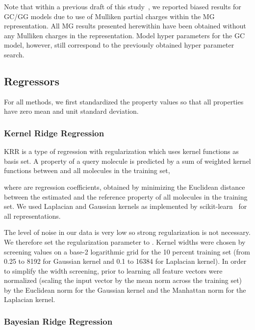 \documentclass[reprint, superscriptaddress,
amsmath,amssymb, aps, prb,
]{revtex4-1}
\begin{document}
{Note that within a previous draft of this study~\cite{faber2017fast}, we reported biased results for GC/GG models due to use of Mulliken partial charges within the MG representation.
All MG results presented herewithin have been obtained without any Mulliken charges in the representation. 
Model hyper parameters for the GC model, however, still correspond to the previously obtained hyper parameter search. 

\subsection{Regressors}

For all methods, we first standardized the property values so that all properties have zero mean and unit standard deviation.

\subsubsection{Kernel Ridge Regression}

KRR \cite{muller2001introduction,scholkopf2002learning,Vovk2013,kernel_ridge_regression2}  is a type of regression with regularization
\cite{Ridge_Regression} which uses kernel functions as basis set.
A property  of a query molecule  is predicted by a sum of weighted kernel functions  between  and all molecules  in the training set, 


where  are regression coefficients, obtained by minimizing the Euclidean distance between the estimated and the reference property of all molecules in the training set. 
We used Laplacian and Gaussian kernels as implemented by scikit-learn~\cite{scikit-learn} for all representations.

The level of noise in our data is very low so strong regularization is not necessary. We therefore set the regularization parameter to . Kernel widths were chosen by screening values on a base-2 logarithmic grid for the 10 percent training set (from 0.25 to 8192 for Gaussian kernel and 0.1 to 16384 for Laplacian kernel). In order to simplify the width screening, prior to learning all feature vectors were normalized (scaling the input vector by the mean norm across the training set) by the Euclidean norm for the Gaussian kernel and the Manhattan norm for the Laplacian kernel.


\subsubsection{Bayesian Ridge Regression}

}
\end{document}
